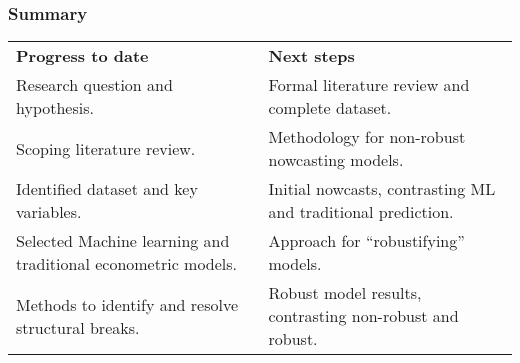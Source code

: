 \begin{frame}[shrink=25]
    \frametitle{Summary}
    \vspace{10pt}
    \begin{table}[]
        \setlength{\extrarowheight}{10pt}
        \begin{tabular}{p{200pt}| p{200pt}}
            \textbf{Progress to date}                                                                                 & \textbf{Next steps}                                                         \\
            Research question and hypothesis.                                                            & Formal literature review and complete dataset.      \\
            Scoping literature review.                                                                   & Methodology for non-robust nowcasting models.                      \\
            Identified dataset and key variables.                                   & Initial nowcasts, contrasting ML and traditional prediction. \\
            Selected Machine learning and traditional econometric models. & Approach for “robustifying” models.                           \\
            Methods to identify and resolve structural breaks.                       & Robust model results, contrasting non-robust and robust.
        \end{tabular}
    \end{table}
\end{frame}